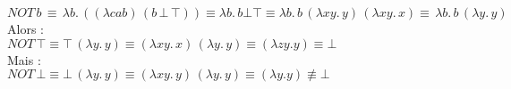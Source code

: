\documentclass[12pt,letterpaper,boxed]{hmcpset}
\begin{document}
\noindent $NOT \, b \, \equiv \, \lambda b. \, ((\lambda c a b) \, (b \, \bot \, \top)) \equiv  \lambda b. \, b \bot \top \equiv  \lambda b. \, b \, (\lambda xy. \, y) \, ( \lambda xy. \, x) \equiv \,  \lambda b. \, b \, (\lambda y. \, y)$  \\
Alors :  \\
\noindent
$NOT \, \top \equiv \top \, (\lambda y. \, y) \equiv (\lambda xy. \, x) \, (\lambda y. \, y) \equiv (\lambda z y. y) \equiv \bot  $ \\
\noindent
Mais : \\
$NOT \, \bot \equiv \bot \, (\lambda y. \, y) \equiv (\lambda xy. \, y) \, (\lambda y. \, y) \equiv (\lambda y . y) \not \equiv \bot  $
\end{document}
